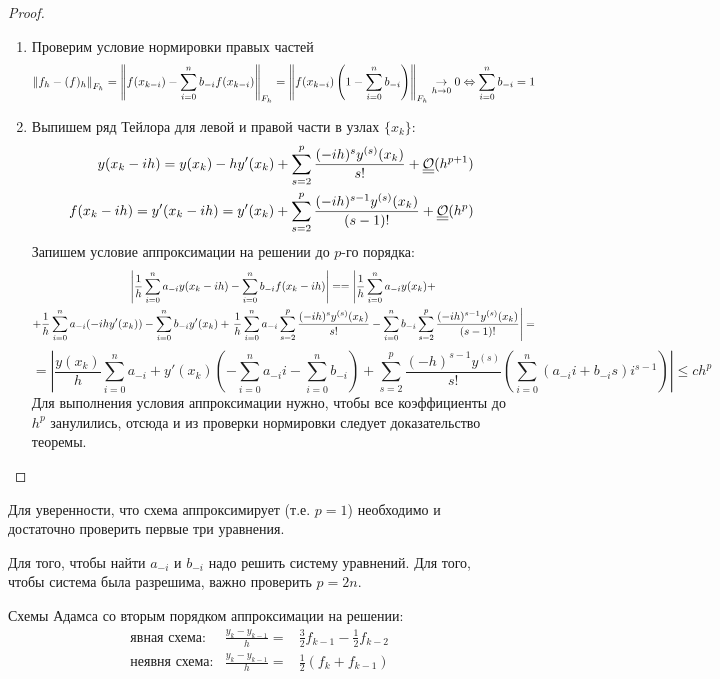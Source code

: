 \begin{proof}
  \begin{enumerate}
    \item Проверим условие нормировки правых частей
          \[\left\lVert f_h-(f)_h\right\rVert_{F_h}=\left\lVert f(x_{k-i})-\sum_{i=0}^nb_{-i}f(x_{k-i})\right\rVert_{F_h}=\left\lVert f(x_{k-i})\left(1-\sum_{i=0}^nb_{-i}\right)\right\rVert_{F_h}\underset{h\rightarrow0}{\rightarrow}0\Leftrightarrow\sum_{i=0}^nb_{-i}=1\]
    \item Выпишем ряд Тейлора для левой и правой части в узлах $\{x_k\}$:
          \begin{align*}
            y(x_k-ih)=y(x_k)-hy'(x_k)+\sum_{s=2}^{p}\frac{(-ih)^{s}y^{(s)}(x_k)}{s!} + \underline{\underline{\mathcal{O}}}(h^{p+1})        \\
            f(x_k-ih)=y'(x_k-ih)=y'(x_k)+\sum_{s=2}^{p}\frac{(-ih)^{s-1}y^{(s)}(x_k)}{(s-1)!} + \underline{\underline{\mathcal{O}}}(h^{p}) \\
          \end{align*}
          Запишем условие аппроксимации на решении до $p$-го порядка:
          \begin{multline*}
            \left\lvert\frac{1}{h}\sum_{i=0}^na_{-i}y(x_k-ih)-\sum_{i=0}^nb_{-i}f(x_k-ih)\right\rvert =
            = \left|\frac{1}{h}\sum_{i=0}^na_{-i}y(x_k)+\right. \\
            +\frac{1}{h}\sum_{i=0}^na_{-i}(-ihy'(x_k))-\sum_{i=0}^nb_{-i}y'(x_k)+\left.\frac{1}{h}\sum_{i=0}^na_{-i}\sum_{s=2}^{p}\frac{(-ih)^sy^{(s)}(x_k)}{s!}-\sum_{i=0}^nb_{-i}\sum_{s=2}^{p}\frac{(-ih)^{s-1}y^{(s)}(x_k)}{(s-1)!}\right|=
          \end{multline*}
          \[
            =\left|\frac{y(x_k)}{h}\sum_{i=0}^na_{-i}+y'(x_k)\left(-\sum_{i=0}^na_{-i}i-\sum_{i=0}^nb_{-i}\right)
            +\sum_{s=2}^{p}\frac{(-h)^{s-1}y^{(s)}}{s!}\left(\sum_{i=0}^n(a_{-i}i+b_{-i}s)i^{s-1}\right)\right|\leq ch^p
          \]
          Для выполнения условия аппроксимации нужно, чтобы все коэффициенты до $h^p$ занулились, отсюда
          и из проверки нормировки следует доказательство теоремы.
  \end{enumerate}
\end{proof}
\begin{remark}
  Для уверенности, что схема аппроксимирует (т.е. $p = 1$)
  необходимо и достаточно проверить первые три уравнения.

  Для того, чтобы найти $a_{-i}$ и $b_{-i}$ надо решить систему уравнений.
  Для того, чтобы система была разрешима, важно проверить $p=2n$.
\end{remark}
\begin{example}
  Схемы Адамса со вторым порядком аппроксимации на решении:
  \[\begin{array}{ccc}
      \text{явная схема}:  & \frac{y_{k}-y_{k-1}}{h} = & \frac{3}{2}f_{k-1}-\frac{1}{2}f_{k-2}   \\
      \text{неявня схема}: & \frac{y_{k}-y_{k-1}}{h} = & \frac{1}{2}\left({f_{k}+f_{k-1}}\right)
    \end{array}\]
\end{example}

